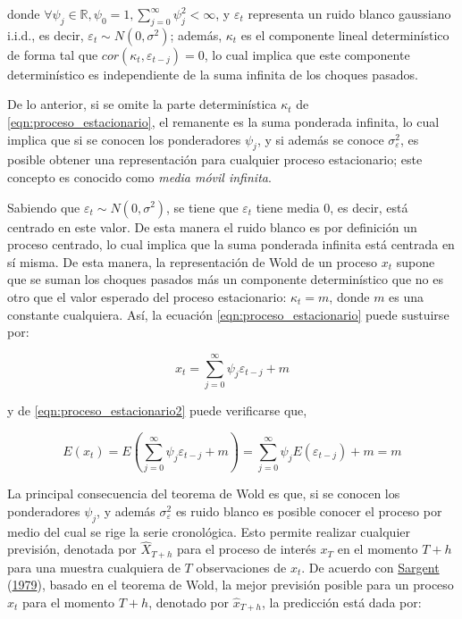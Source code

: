 \documentclass[
]{article}
\begin{document}
donde
\(\forall \psi_j \in \mathbb{R}, \psi_0=1, \sum_{j=0}^{\infty} \psi_j^2<\infty\),
y \(\varepsilon_t\) representa un ruido blanco gaussiano i.i.d., es
decir, \(\varepsilon_t \sim N(0, \sigma^2)\); además, \(\kappa_t\) es el
componente lineal determinístico de forma tal que
\(cor(\kappa_t,\varepsilon_{t-j})=0\), lo cual implica que este
componente determinístico es independiente de la suma infinita de los
choques pasados.

De lo anterior, si se omite la parte determinística \(\kappa_t\) de
\ref{eqn:proceso_estacionario}, el remanente es la suma ponderada
infinita, lo cual implica que si se conocen los ponderadores \(\psi_j\),
y si además se conoce \(\sigma_\varepsilon^2\), es posible obtener una
representación para cualquier proceso estacionario; este concepto es
conocido como \emph{media móvil infinita}.

Sabiendo que \(\varepsilon_t \sim N(0, \sigma^2)\), se tiene que
\(\varepsilon_t\) tiene media 0, es decir, está centrado en este valor.
De esta manera el ruido blanco es por definición un proceso centrado, lo
cual implica que la suma ponderada infinita está centrada en sí misma.
De esta manera, la representación de Wold de un proceso \(x_t\) supone
que se suman los choques pasados más un componente determinístico que no
es otro que el valor esperado del proceso estacionario: \(\kappa_t=m\),
donde \(m\) es una constante cualquiera. Así, la ecuación
\ref{eqn:proceso_estacionario} puede sustuirse por:

\begin{equation}
\label{eqn:proceso_estacionario2}
x_t=\sum_{j=0}^{\infty} \psi_j\varepsilon_{t-j}+m
\end{equation}

y de \ref{eqn:proceso_estacionario2} puede verificarse que,

\begin{equation}
\label{eqn:dem_proceso_estacionario2}
E(x_t)=E\left(\sum_{j=0}^{\infty} \psi_j\varepsilon_{t-j}+m\right)=\sum_{j=0}^{\infty} \psi_jE\left(\varepsilon_{t-j}\right) + m = m
\end{equation}

La principal consecuencia del teorema de Wold es que, si se conocen los
ponderadores \(\psi_j\), y además \(\sigma_\varepsilon^2\) es ruido
blanco es posible conocer el proceso por medio del cual se rige la serie
cronológica. Esto permite realizar cualquier previsión, denotada por
\(\hat X_{T+h}\) para el proceso de interés \(x_T\) en el momento
\(T+h\) para una muestra cualquiera de \(T\) observaciones de \(x_t\).
De acuerdo con \protect\hyperlink{ref-sargent_macro}{Sargent}
(\protect\hyperlink{ref-sargent_macro}{1979}), basado en el teorema de
Wold, la mejor previsión posible para un proceso \(x_t\) para el momento
\(T+h\), denotado por \(\hat x_{T+h}\), la predicción está dada por:
\end{document}
